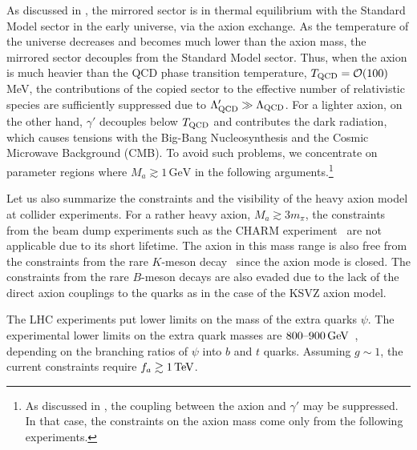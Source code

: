 \documentclass[aps,amsmath,preprint,epsf,superscriptaddress,nofootinbib,notitlepage]{revtex4-1}
\begin{document}
As discussed in \cite{Fukuda:2015ana}, the mirrored sector is in thermal equilibrium 
with the Standard Model sector in the early universe, via the axion exchange.
As the temperature of the universe decreases and becomes much lower than the axion mass, 
the mirrored sector decouples from the Standard Model sector.
Thus, when the axion is much heavier than the QCD phase transition temperature,  $T_{\rm QCD} = {\cal O}(100)$\,MeV, 
the contributions of the copied sector to the effective number of relativistic species are sufficiently suppressed 
due to $\Lambda_{\rm QCD}' \gg \Lambda_{\rm QCD}$.
For a lighter axion, on the other hand, $\gamma'$  decouples below $T_{\rm QCD}$ and contributes
the dark radiation, which causes tensions with the Big-Bang Nucleosynthesis and the Cosmic Microwave Background (CMB).
To avoid such problems, we concentrate on parameter regions where $M_{a} \gtrsim 1\,\text{GeV}$ in the following arguments.\footnote{As discussed in \cite{Chiang:2016eav}, the coupling between the axion and $\gamma'$ may be suppressed. In that case, the constraints on the axion mass come only from the following experiments.}

Let us also summarize the constraints and the visibility of the heavy axion model at collider experiments.
For a rather heavy axion, $M_a \gtrsim 3m_\pi$, the constraints from the beam dump experiments such as the CHARM experiment~\cite{Bergsma:1985qz} 
are not applicable due to its short lifetime.
The axion in this mass range is also free from the constraints from the rare $K$-meson decay~\cite{Artamonov:2009sz} since the axion mode is closed.
The constraints from the rare $B$-meson decays are also evaded due to the lack of the direct axion couplings to the quarks 
as in the case of the KSVZ axion model.

The LHC experiments put  lower limits on the mass of the extra quarks $\psi$.
The experimental lower limits on the extra quark masses 
are $800\mbox{--}900\,{\rm GeV}$~\cite{Aad:2014efa,Aad:2015tba,Khachatryan:2015gza,Khachatryan:2015oba}, 
depending on the branching ratios of $\psi$ into $b$ and $t$ quarks.
Assuming $g \sim 1$, the current constraints require $f_a\gtrsim1\,{\rm TeV}$.
\end{document}
